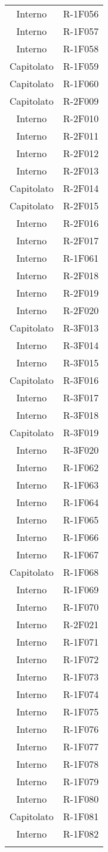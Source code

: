 \begin{tabularx}{\textwidth}{c|c}
		Interno & R-1F056 \\
		Interno & R-1F057 \\
		Interno & R-1F058 \\
		Capitolato & R-1F059 \\
		Capitolato & R-1F060 \\
		Capitolato & R-2F009 \\
		Interno & R-2F010 \\
		Interno & R-2F011 \\
		Interno & R-2F012 \\
		Interno & R-2F013 \\
		Capitolato & R-2F014 \\
		Capitolato & R-2F015 \\
		Interno & R-2F016 \\
		Interno & R-2F017 \\
		Interno & R-1F061 \\
		Interno & R-2F018 \\
		Interno & R-2F019 \\
		Interno & R-2F020 \\
		Capitolato & R-3F013 \\
		Interno & R-3F014 \\
		Interno & R-3F015 \\
		Capitolato & R-3F016 \\
		Interno & R-3F017 \\
		Interno & R-3F018 \\
		Capitolato & R-3F019 \\
		Interno & R-3F020 \\
		Interno & R-1F062 \\
		Interno & R-1F063 \\
		Interno & R-1F064 \\
		Interno & R-1F065 \\
		Interno & R-1F066 \\
		Interno & R-1F067 \\
		Capitolato & R-1F068 \\
		Interno & R-1F069 \\
		Interno & R-1F070 \\
		Interno & R-2F021 \\
		Interno & R-1F071 \\
		Interno & R-1F072 \\
		Interno & R-1F073 \\
		Interno & R-1F074 \\
		Interno & R-1F075 \\
		Interno & R-1F076 \\
		Interno & R-1F077 \\
		Interno & R-1F078 \\
		Interno & R-1F079 \\
		Interno & R-1F080 \\
		Capitolato & R-1F081 \\
		Interno & R-1F082 \\


	
	\rowcolor{white}
	\caption{Tabella tracciamento fonti-requisiti} \label{tab:tabellafonterequisiti}
\end{tabularx}


